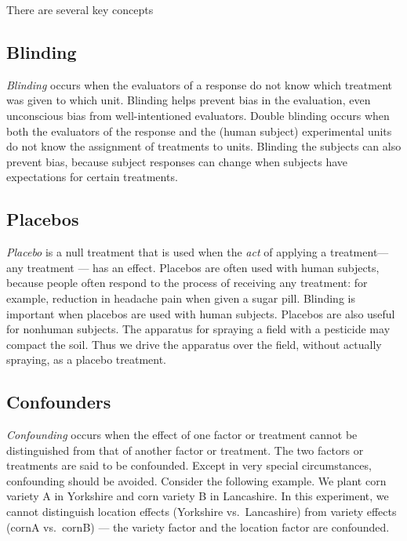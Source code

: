 \documentclass[
]{book}
\begin{document}
There are several key concepts

\hypertarget{blinding}{%
\subsection{Blinding}\label{blinding}}

\emph{Blinding} occurs when the evaluators of a response do not know which treatment was given to which unit. Blinding helps prevent bias in the evaluation, even unconscious bias from well-intentioned evaluators. Double blinding occurs when both the evaluators of the response and the (human subject) experimental units do not know the assignment of treatments to units. Blinding the subjects can also prevent bias, because subject responses can change when subjects have expectations for certain treatments.

\hypertarget{placebos}{%
\subsection{Placebos}\label{placebos}}

\emph{Placebo} is a null treatment that is used when the \emph{act} of applying a treatment--- any treatment --- has an effect. Placebos are often used with human subjects, because people often respond to the process of receiving any treatment: for example, reduction in headache pain when given a sugar pill. Blinding is important when placebos are used with human subjects. Placebos are also useful for nonhuman subjects. The apparatus for spraying a field with a pesticide may compact the soil. Thus we drive the apparatus over the field, without actually spraying, as a placebo treatment.

\hypertarget{confounders}{%
\subsection{Confounders}\label{confounders}}

\emph{Confounding} occurs when the effect of one factor or treatment cannot be distinguished from that of another factor or treatment. The two factors or treatments are said to be confounded. Except in very special circumstances, confounding should be avoided. Consider the following example. We plant corn variety A in Yorkshire and corn variety B in Lancashire. In this experiment, we cannot distinguish location effects (Yorkshire vs.~Lancashire) from variety effects (cornA vs.~cornB) --- the variety factor and the location factor are confounded.
\end{document}
